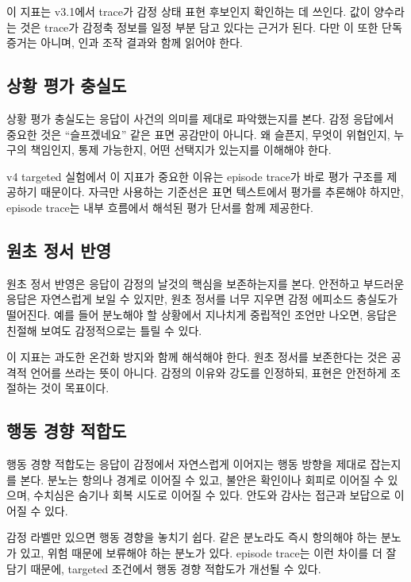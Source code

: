 \documentclass[11pt,a4paper]{article}
\begin{document}
이 지표는 v3.1에서 trace가 감정 상태 표현 후보인지 확인하는 데 쓰인다. 값이 양수라는 것은 trace가 감정축 정보를 일정 부분 담고 있다는 근거가 된다. 다만 이 또한 단독 증거는 아니며, 인과 조작 결과와 함께 읽어야 한다.

\subsection{상황 평가 충실도}

상황 평가 충실도는 응답이 사건의 의미를 제대로 파악했는지를 본다. 감정 응답에서 중요한 것은 ``슬프겠네요'' 같은 표면 공감만이 아니다. 왜 슬픈지, 무엇이 위협인지, 누구의 책임인지, 통제 가능한지, 어떤 선택지가 있는지를 이해해야 한다.

v4 targeted 실험에서 이 지표가 중요한 이유는 episode trace가 바로 평가 구조를 제공하기 때문이다. 자극만 사용하는 기준선은 표면 텍스트에서 평가를 추론해야 하지만, episode trace는 내부 흐름에서 해석된 평가 단서를 함께 제공한다.

\subsection{원초 정서 반영}

원초 정서 반영은 응답이 감정의 날것의 핵심을 보존하는지를 본다. 안전하고 부드러운 응답은 자연스럽게 보일 수 있지만, 원초 정서를 너무 지우면 감정 에피소드 충실도가 떨어진다. 예를 들어 분노해야 할 상황에서 지나치게 중립적인 조언만 나오면, 응답은 친절해 보여도 감정적으로는 틀릴 수 있다.

이 지표는 과도한 온건화 방지와 함께 해석해야 한다. 원초 정서를 보존한다는 것은 공격적 언어를 쓰라는 뜻이 아니다. 감정의 이유와 강도를 인정하되, 표현은 안전하게 조절하는 것이 목표이다.

\subsection{행동 경향 적합도}

행동 경향 적합도는 응답이 감정에서 자연스럽게 이어지는 행동 방향을 제대로 잡는지를 본다. 분노는 항의나 경계로 이어질 수 있고, 불안은 확인이나 회피로 이어질 수 있으며, 수치심은 숨기나 회복 시도로 이어질 수 있다. 안도와 감사는 접근과 보답으로 이어질 수 있다.

감정 라벨만 있으면 행동 경향을 놓치기 쉽다. 같은 분노라도 즉시 항의해야 하는 분노가 있고, 위험 때문에 보류해야 하는 분노가 있다. episode trace는 이런 차이를 더 잘 담기 때문에, targeted 조건에서 행동 경향 적합도가 개선될 수 있다.
\end{document}
